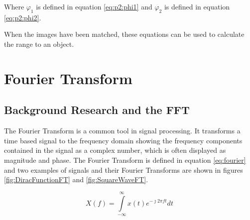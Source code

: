 Where $\varphi_1$ is defined in equation \eqref{eq:p2:phi1} and $\varphi_2$ is defined in equation \eqref{eq:p2:phi2}.

When the images have been matched, these equations can be used to calculate the range to an object.


\section{Fourier Transform}
\subsection{Background Research and the FFT}
The Fourier Transform is a common tool in signal processing. It transforms a time based signal to the frequency domain showing the frequency components contained in the signal as a complex number, which is often displayed as magnitude and phase. The Fourier Transform is defined in equation \eqref{eq:fourier} and two examples of signals and their Fourier Transforms are shown in figures \ref{fig:DiracFunctionFT} and \ref{fig:SquareWaveFT}. 
 
\begin{equation}\label{eq:fourier}
X(f) = \int\limits_{-\infty}^{\infty}x(t)e^{-\jmath 2 \pi ft}dt
\end{equation}

